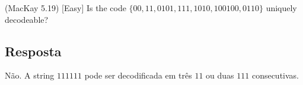 (MacKay 5.19) [Easy]
Is the code $\{00, 11, 0101, 111, 1010, 100100, 0110\}$ uniquely decodeable?

\subsection*{Resposta}

Não. A string $111111$ pode ser decodificada em três $11$ ou duas $111$ consecutivas.

